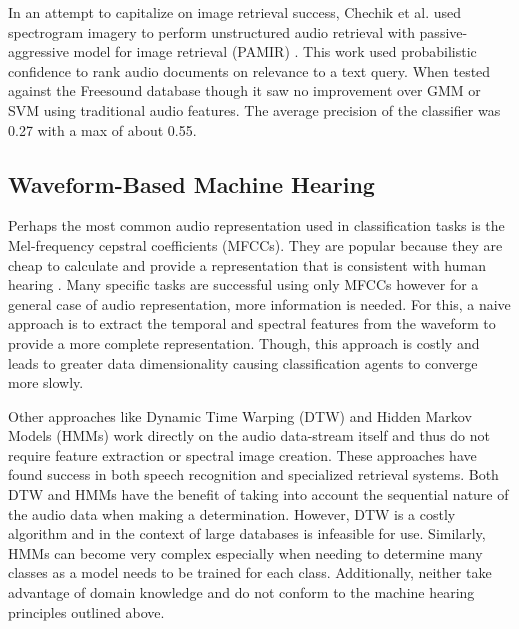 In an attempt to capitalize on image retrieval success, Chechik et al. used
spectrogram imagery to perform unstructured audio retrieval with
passive-aggressive model for image retrieval (PAMIR) \cite{Chechik2008}. This
work used probabilistic confidence to rank audio documents on relevance to a
text query. When tested against the Freesound database though it saw no
improvement over GMM or SVM using traditional audio features. The average
precision of the classifier was 0.27 with a max of about 0.55.

\subsection{Waveform-Based Machine Hearing}
Perhaps the most common audio representation used in classification tasks is the
Mel-frequency cepstral coefficients (MFCCs). They are popular because they are
cheap to calculate and provide a representation that is consistent with human
hearing \cite{kaur-feature-2015}. Many specific tasks are successful using only
MFCCs however for a general case of audio representation, more information is
needed. For this, a naive approach is to extract the temporal and spectral
features from the waveform to provide a more complete representation. Though,
this approach is costly and leads to greater data dimensionality causing
classification agents to converge more slowly.

Other approaches like Dynamic Time Warping (DTW) and Hidden Markov Models (HMMs)
work directly on the audio data-stream itself and thus do not require feature
extraction or spectral image creation. These approaches have found success in
both speech recognition and specialized retrieval systems. Both DTW and HMMs
have the benefit of taking into account the sequential nature of the audio data
when making a determination. However, DTW is a costly algorithm and in the
context of large databases is infeasible for use. Similarly, HMMs can become very
complex especially when needing to determine many classes as a model needs to be
trained for each class. Additionally, neither take advantage of domain knowledge
and do not conform to the machine hearing principles outlined above.

